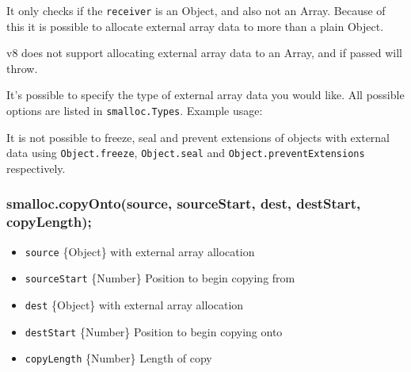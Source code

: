 It only checks if the \texttt{receiver} is an Object, and also not an
Array. Because of this it is possible to allocate external array data to
more than a plain Object.

\begin{Shaded}
\begin{Highlighting}[]
 \NormalTok{() \{ \}}
\NormalTok{(}

\end{Highlighting}
\end{Shaded}

v8 does not support allocating external array data to an Array, and if
passed will throw.

It's possible to specify the type of external array data you would like.
All possible options are listed in \texttt{smalloc.Types}. Example
usage:

\begin{Shaded}
\begin{Highlighting}[]
 \NormalTok{(}\NormalTok{, }\NormalTok{);}

 \NormalTok{(} 
  \NormalTok{;}

\end{Highlighting}
\end{Shaded}

It is not possible to freeze, seal and prevent extensions of objects
with external data using \texttt{Object.freeze}, \texttt{Object.seal}
and \texttt{Object.preventExtensions} respectively.

\subsubsection{smalloc.copyOnto(source, sourceStart, dest, destStart,
copyLength);}\label{smalloc.copyontosource-sourcestart-dest-deststart-copylength}

\begin{itemize}
\itemsep1pt\parskip0pt
\item
  \texttt{source} \{Object\} with external array allocation
\item
  \texttt{sourceStart} \{Number\} Position to begin copying from
\item
  \texttt{dest} \{Object\} with external array allocation
\item
  \texttt{destStart} \{Number\} Position to begin copying onto
\item
  \texttt{copyLength} \{Number\} Length of copy
\end{itemize}

